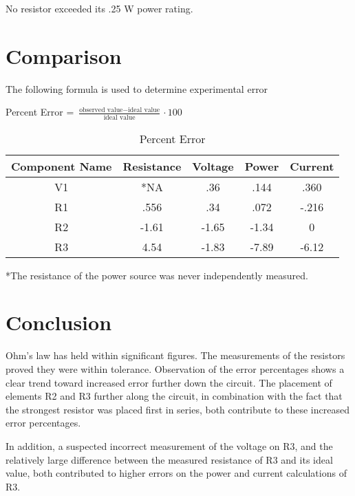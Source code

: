\documentclass[journal]{IEEEtran}
\begin{document}
No resistor exceeded its .25 W power rating.

\section{Comparison}

The following formula is used to determine experimental error

Percent Error = $\frac{\textrm{observed value} - \textrm{ideal value}}{\textrm{ideal value}}\cdot 100$

\begin{table}[h!]
\renewcommand{\arraystretch}{1.5}
\caption{Percent Error}
\label{table_error}
\centering
\begin{tabular}{|c|c|c|c|c|}
\hline
Component Name & Resistance & Voltage & Power & Current\\
\hline
V1 & *NA & .36 & .144 & .360\\
\hline
R1 & .556 & .34 & .072 & -.216\\
\hline
R2 & -1.61 & -1.65 & -1.34 & 0\\
\hline
R3 & 4.54  & -1.83 & -7.89 & -6.12\\
\hline
\end{tabular}
\end{table}

*The resistance of the power source was never independently measured.

\section{Conclusion}

Ohm's law has held within significant figures. The measurements of the resistors proved
they were within tolerance. Observation of the error percentages shows a clear trend
toward increased error further down the circuit. The placement of elements R2 and R3 further 
along the circuit, in combination with the fact that the strongest resistor was placed 
first in series, both contribute to these increased error percentages. 

In addition, a suspected incorrect measurement of the voltage on R3, and the relatively large difference between the measured resistance of R3 and its ideal value, both contributed to higher errors on the power and current calculations of R3.

\end{document}
